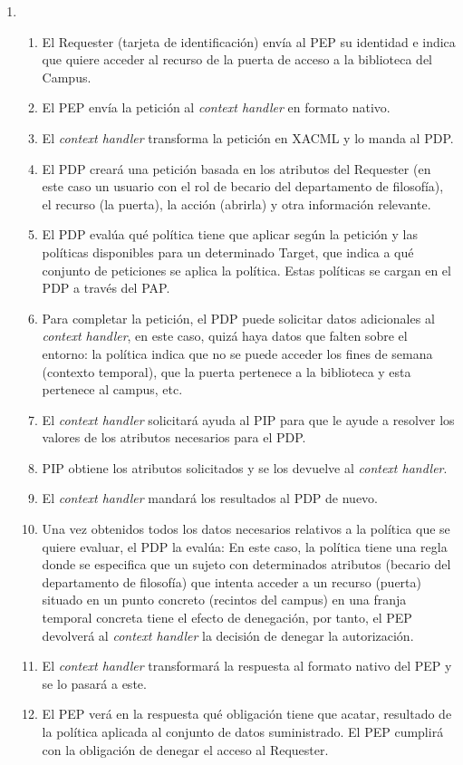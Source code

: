 \documentclass[10pt,a4paper]{article}
\begin{document}
\begin{enumerate}[label=\alph*]
\item 
\begin{enumerate}[label=(\arabic*)]
\item El Requester (tarjeta de identificación) envía al PEP su identidad e indica que quiere acceder al recurso de la puerta de acceso a la biblioteca del Campus.
\item El PEP envía la petición al \textit{context handler} en formato nativo.
\item El \textit{context handler} transforma la petición en XACML y lo manda al PDP.
\item El PDP creará una petición basada en los atributos del Requester (en este caso un usuario con el rol de becario del departamento de filosofía), el recurso (la puerta), la acción (abrirla) y otra información relevante.
\item El PDP evalúa qué política tiene que aplicar según la petición y las políticas disponibles para un determinado Target, que indica a qué conjunto de peticiones se aplica la política. Estas políticas se cargan en el PDP a través del PAP.
\item Para completar la petición, el PDP puede solicitar datos adicionales al \textit{context handler}, en este caso, quizá haya datos que falten sobre el entorno: la política indica que no se puede acceder los fines de semana (contexto temporal), que la puerta pertenece a la biblioteca y esta pertenece al campus, etc.
\item El \textit{context handler} solicitará ayuda al PIP para que le ayude a resolver los valores de los atributos necesarios para el PDP.
\item PIP obtiene los atributos solicitados y se los devuelve al \textit{context handler}.
\item El \textit{context handler} mandará los resultados al PDP de nuevo.
\item Una vez obtenidos todos los datos necesarios relativos a la política que se quiere evaluar, el PDP la evalúa: En este caso, la política tiene una regla donde se especifica que un sujeto con determinados atributos (becario del departamento de filosofía) que intenta acceder a un recurso (puerta) situado en un punto concreto (recintos del campus) en una franja temporal concreta tiene el efecto de denegación, por tanto, el PEP devolverá al \textit{context handler} la decisión de denegar la autorización.
\item El \textit{context handler} transformará la respuesta al formato nativo del PEP y se lo pasará a este.
\item El PEP verá en la respuesta qué obligación tiene que acatar, resultado de la política aplicada al conjunto de datos suministrado. El PEP cumplirá con la obligación de denegar el acceso al Requester.
\end{enumerate}


\end{enumerate}
\end{document}
